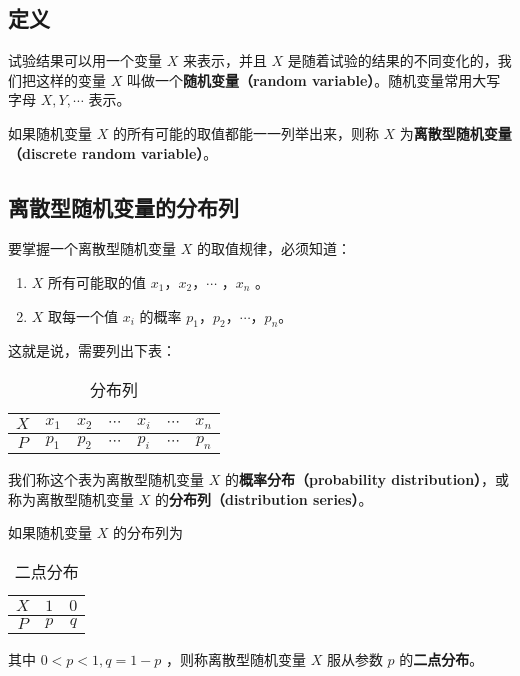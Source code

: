 

\subsection{定义}
试验结果可以用一个变量 $X$ 来表示，并且 $X$ 是随着试验的结果的不同变化的，我们把这样的变量 $X$ 叫做一个\textbf{随机变量（random variable）}。随机变量常用大写字母 $X,Y,\cdots$ 表示。

如果随机变量  $X$ 的所有可能的取值都能一一列举出来，则称 $X$ 为\textbf{离散型随机变量（discrete random variable）}。

\subsection{离散型随机变量的分布列}
要掌握一个离散型随机变量 $X$ 的取值规律，必须知道：
\begin{enumerate}
\item $X$ 所有可能取的值 $x_1$，$x_2$，$\cdots$ ，$x_n$ 。
\item $X$ 取每一个值 $x_i$ 的概率 $p_1$，$p_2$，$\cdots$，$p_n$。
\end{enumerate}
这就是说，需要列出下表：

\begin{table}[ht]
\centering
\caption{分布列}\label{tab_HsDRV_1}
\begin{tabular}{|c|c|c|c|c|c|c|}
\hline
$X$ & $x_1$ & $x_2$ & $\cdots$ & $x_i$ & $\cdots$ & $x_n$ \\
\hline
$P$ & $p_1$ & $p_2$ & $\cdots$ & $p_i$ & $\cdots$ & $p_n$ \\
\hline
\end{tabular}
\end{table}
我们称这个表为离散型随机变量 $X$ 的\textbf{概率分布（probability distribution）}，或称为离散型随机变量 $X$ 的\textbf{分布列（distribution series）}。

如果随机变量 $X$ 的分布列为

\begin{table}[ht]
\centering
\caption{二点分布}\label{tab_HsDRV_2}
\begin{tabular}{|c|c|c|}
\hline
$X$ & $1$ & $0$ \\
\hline
$P$ & $p$ & $q$ \\
\hline
\end{tabular}
\end{table}
其中 $0<p<1,q=1-p$ ，则称离散型随机变量 $X$ 服从参数 $p$ 的\textbf{二点分布}。

